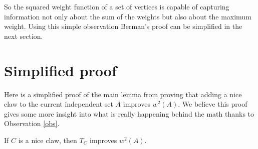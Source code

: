 So the squared weight function of a set of vertices is capable of capturing information not only about the sum of the weights but also about the maximum weight. Using this simple observation Berman's proof can be simplified in the next section.

\section{Simplified proof}\label{sec:ProofBerman}

Here is a simplified proof of the main lemma from \cite{Berman} proving that adding a nice claw to the current independent set $A$ improves $w^2(A)$. We believe this proof gives some more insight into what is really happening behind the math thanks to Observation \ref{obs}.
%
\begin{lemma}\label{lem:Berman2}
If $C$ is a nice claw, then $T_C$ improves $w^2(A)$.
\end{lemma}
%
